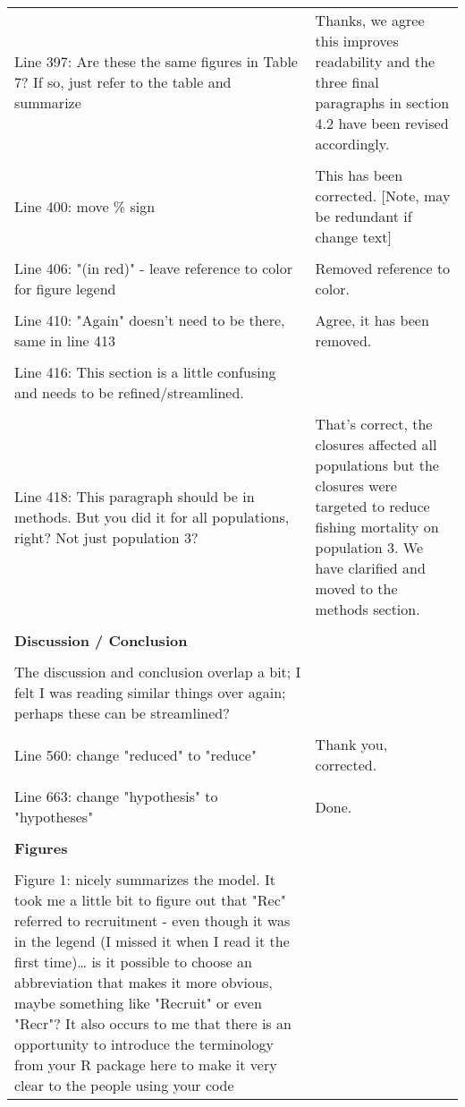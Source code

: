 \documentclass[10pt]{letter}
\begin{document}
\begin{landscape}
\begin{center}
\begin{longtable}{p{12cm} | p{12cm}}
\\
Line 397: Are these the same figures in Table 7? If so, just refer to the table
and summarize & Thanks, we agree this improves readability and the three final
paragraphs in section 4.2 have been revised accordingly. \\
\\
Line 400: move \% sign & This has been corrected. [Note, may be redundant if
change text] \\
\\
Line 406: "(in red)" - leave reference to color for figure legend & Removed
reference to color. \\
\\
Line 410: "Again" doesn't need to be there, same in line 413 & Agree, it has
been removed. \\
\\
Line 416: This section is a little confusing and needs to be refined/streamlined. & \\
\\
Line 418: This paragraph should be in methods. But you did it for all
populations, right? Not just population 3? & That's correct, the closures
affected all populations but the closures were targeted to reduce fishing
mortality on population 3. We have clarified and moved to the methods section.
\\
\\
		\hline
		\textbf{Discussion / Conclusion} &  \\
\\
The discussion and conclusion overlap a bit; I felt I was reading similar
things over again; perhaps these can be streamlined? & \\
\\
Line 560: change "reduced" to "reduce" & Thank you, corrected. \\
\\
Line 663: change "hypothesis" to "hypotheses" & Done. \\
\\
		\hline
		\textbf{Figures} &  \\
\\
Figure 1: nicely summarizes the model. It took me a little bit to figure out
that "Rec" referred to recruitment - even though it was in the legend (I missed
it when I read it the first time)… is it possible to choose an abbreviation
that makes it more obvious, maybe something like "Recruit" or  even "Recr"? It
also occurs to me that there is an opportunity to introduce the terminology
from your R package here to make it very clear to the people using your code

\end{longtable}
\end{center}
\end{landscape}
\end{document}
